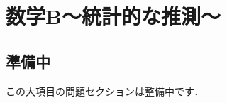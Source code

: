 \documentclass[../../ms_q.tex]{subfiles}
\begin{document}
\section{数学B～統計的な推測～}

\subsection*{準備中}
この大項目の問題セクションは整備中です．
\end{document}
